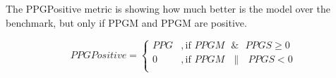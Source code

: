 The \gls{PPG}Positive metric is showing how much better is the model over the benchmark, but only if \gls{PPGM} and \gls{PPGM} are positive.\\

\begin{linenomath}
    \begin{equation}\label{eq:PPGPositive}
        PPG Positive = 
        \begin{cases} 
            PPG & , \text{if } PPGM \text{ }\&\text{ } PPGS \geq 0 \\
            0 & , \text{if } PPGM \text{ }\|\text{ } PPGS < 0 \\
        \end{cases} 
        \end{equation}
    \end{linenomath}
